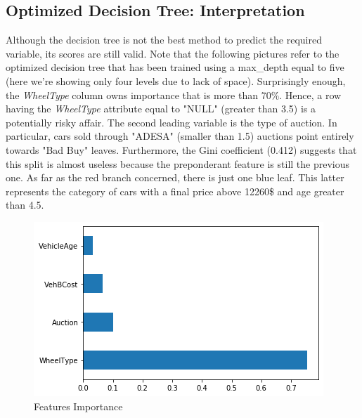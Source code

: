 \documentclass{article}
\begin{document}
	\subsection{Optimized Decision Tree: Interpretation}
	Although the decision tree is not the best method to predict the required variable, its scores are still valid. Note that the following pictures refer to the optimized decision tree that has been trained using a max\_depth equal to five (here we're showing only four levels due to lack of space). Surprisingly enough, the \emph{WheelType} column owns importance that is more than 70\%. Hence, a row having the \emph{WheelType} attribute equal to "NULL" (greater than 3.5) is a potentially risky affair. The second leading variable is the type of auction. In particular, cars sold through "ADESA" (smaller than 1.5) auctions point entirely towards "Bad Buy" leaves. Furthermore, the Gini coefficient (0.412) suggests that this split is almost useless because the preponderant feature is still the previous one. As far as the red branch concerned, there is just one blue leaf. This latter represents the category of cars with a final price above 12260\$ and age greater than 4.5.
	
	\begin{figure}[H]
		\centering
		\includegraphics[width=.4\textwidth]{dectreevar.png}
		\caption{Features Importance}
		\label{fig:optdectreefeat}
	\end{figure}
	
\end{document}
